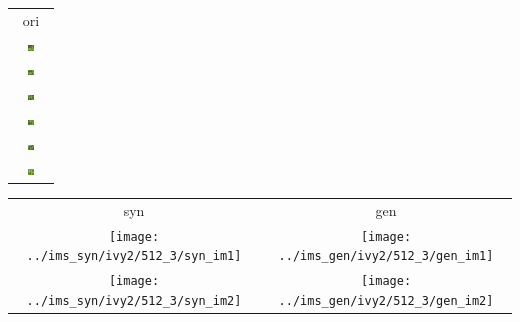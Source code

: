 \documentclass[letter]{article}
\begin{document}
\newpage

\begin{table}[h!]
	\centering
	\begin{tabular}{c}
		ori\tabularnewline
		\includegraphics[width=0.17\textwidth]{../data/ivy2/512/1} \tabularnewline		\includegraphics[width=0.17\textwidth]{../data/ivy2/512/2} \tabularnewline		\includegraphics[width=0.17\textwidth]{../data/ivy2/512/3} \tabularnewline		\includegraphics[width=0.17\textwidth]{../data/ivy2/512/4} \tabularnewline		\includegraphics[width=0.17\textwidth]{../data/ivy2/512/5} \tabularnewline		\includegraphics[width=0.17\textwidth]{../data/ivy2/512/6} \tabularnewline
	\end{tabular}
	\begin{tabular}{cc}
		syn & gen\tabularnewline
		\texttt{[image: ../ims\_syn/ivy2/512\_3/syn\_im1]} & \texttt{[image: ../ims\_gen/ivy2/512\_3/gen\_im1]} \tabularnewline
		\texttt{[image: ../ims\_syn/ivy2/512\_3/syn\_im2]} & \texttt{[image: ../ims\_gen/ivy2/512\_3/gen\_im2]} \tabularnewline

\end{tabular}
\end{table}
\end{document}
